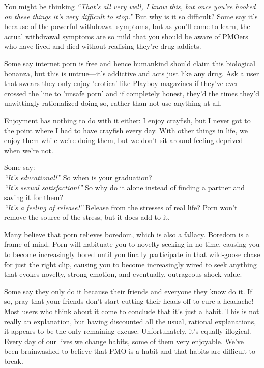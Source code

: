 \documentclass[
]{book}
\begin{document}
You might be thinking \emph{``That's all very well, I know this, but once you're hooked on these things it's very difficult to stop.''} But why is it so difficult? Some say it's because of the powerful withdrawal symptoms, but as you'll come to learn, the actual withdrawal symptoms are so mild that you should be aware of PMOers who have lived and died without realising they're drug addicts.

Some say internet porn is free and hence humankind should claim this biological bonanza, but this is untrue---it's addictive and acts just like any drug. Ask a user that swears they only enjoy 'erotica' like Playboy magazines if they've ever crossed the line to 'unsafe porn' and if completely honest, they'd the times they'd unwittingly rationalized doing so, rather than not use anything at all.

Enjoyment has nothing to do with it either: I enjoy crayfish, but I never got to the point where I had to have crayfish every day. With other things in life, we enjoy them while we're doing them, but we don't sit around feeling deprived when we're not.

Some say:\\
\emph{``It's educational!''} So when is your graduation?\\
\emph{``It's sexual satisfaction!''} So why do it alone instead of finding a partner and saving it for them?\\
\emph{``It's a feeling of release!''} Release from the stresses of real life? Porn won't remove the source of the stress, but it does add to it.

Many believe that porn relieves boredom, which is also a fallacy. Boredom is a frame of mind. Porn will habituate you to novelty-seeking in no time, causing you to become increasingly bored until you finally participate in that wild-goose chase for just the right clip, causing you to become increasingly wired to seek anything that evokes novelty, strong emotion, and eventually, outrageous shock value.

Some say they only do it because their friends and everyone they know do it. If so, pray that your friends don't start cutting their heads off to cure a headache! Most users who think about it come to conclude that it's just a habit. This is not really an explanation, but having discounted all the usual, rational explanations, it appears to be the only remaining excuse. Unfortunately, it's equally illogical. Every day of our lives we change habits, some of them very enjoyable. We've been brainwashed to believe that PMO is a habit and that habits are difficult to break.
\end{document}
